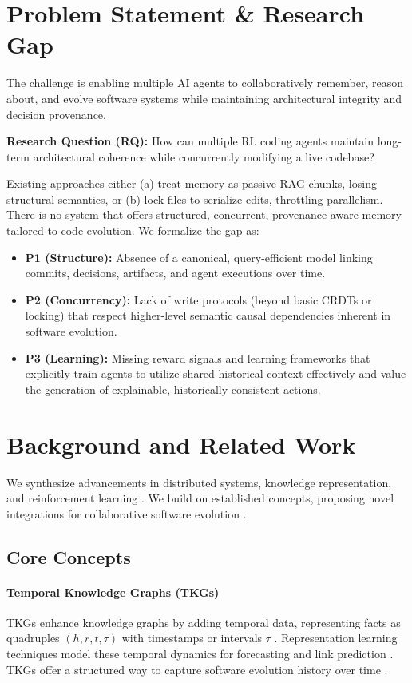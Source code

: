 \documentclass{article}
\begin{document}
\section{Problem Statement \& Research Gap}
The challenge is enabling multiple AI agents to collaboratively remember, reason about, and evolve software systems while maintaining architectural integrity and decision provenance.

\noindent\textbf{Research Question (RQ):} How can multiple RL coding agents maintain long-term architectural coherence while concurrently modifying a live codebase?

Existing approaches either (a) treat memory as passive RAG chunks, losing structural semantics, or (b) lock files to serialize edits, throttling parallelism. There is no system that offers structured, concurrent, provenance-aware memory tailored to code evolution. We formalize the gap as:
\begin{itemize}
  \item \textbf{P1 (Structure):} Absence of a canonical, query-efficient model linking commits, decisions, artifacts, and agent executions over time.
  \item \textbf{P2 (Concurrency):} Lack of write protocols (beyond basic CRDTs or locking) that respect higher-level semantic causal dependencies inherent in software evolution.
  \item \textbf{P3 (Learning):} Missing reward signals and learning frameworks that explicitly train agents to utilize shared historical context effectively and value the generation of explainable, historically consistent actions.
\end{itemize}

\section{Background and Related Work}
We synthesize advancements in distributed systems, knowledge representation, and reinforcement learning \cite{ref34}. We build on established concepts, proposing novel integrations for collaborative software evolution \cite{ref35}.

\subsection{Core Concepts}
\paragraph{Temporal Knowledge Graphs (TKGs)}
TKGs enhance knowledge graphs by adding temporal data, representing facts as quadruples $(h,r,t,\tau)$ with timestamps or intervals $\tau$ \cite{ref23}. Representation learning techniques model these temporal dynamics for forecasting and link prediction \cite{ref3,ref4,ref23,ref38}. TKGs offer a structured way to capture software evolution history over time \cite{ref37}.
\end{document}

